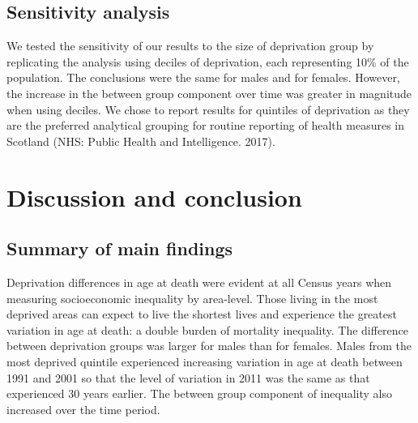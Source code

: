 \documentclass[12pt,oneside,a4paper]{article} %
\theoremstyle{definition}
\begin{document}
\subsection{Sensitivity analysis}
We tested the sensitivity of our results to the size of deprivation group by replicating the analysis using deciles of deprivation, each representing 10\% of the population. The conclusions were the same for males and for females. However, the increase in the between group component over time was greater in magnitude when using deciles. We chose to report results for quintiles of deprivation as they are the preferred analytical grouping for routine reporting of health measures in Scotland (NHS: Public Health and Intelligence. 2017).

\section{Discussion and conclusion}

\subsection{Summary of main findings}
Deprivation differences in age at death were evident at all Census years when measuring socioeconomic inequality by area-level. Those living in the most deprived areas can expect to live the shortest lives and experience the greatest variation in age at death: a double burden of mortality inequality. The difference between deprivation groups was larger for males than for females. Males from the most deprived quintile experienced increasing variation in age at death between 1991 and 2001 so that the level of variation in 2011 was the same as that experienced 30 years earlier. The between group component of inequality also increased over the time period.
\end{document}
